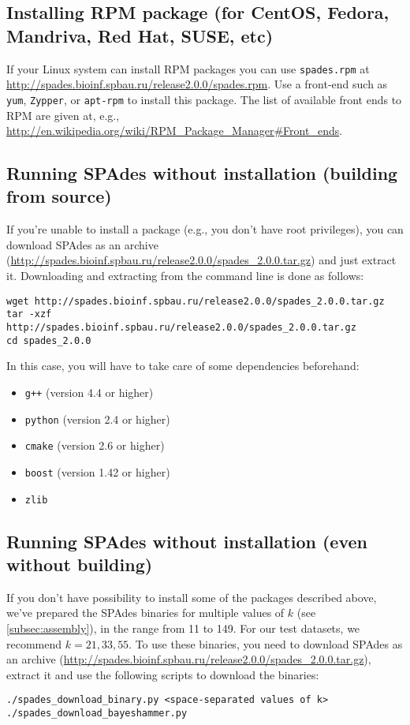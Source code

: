 \documentclass{article}
\def\spades{SPAdes}
\begin{document}
\subsection{Installing RPM package (for CentOS, Fedora, Mandriva, Red Hat, SUSE, etc)}\label{subsec:rpm_package}
If your Linux system can install RPM packages you can use {\tt spades.rpm}
at \url{http://spades.bioinf.spbau.ru/release2.0.0/spades.rpm}. Use a front-end
such as {\tt yum}, {\tt Zypper}, or {\tt apt-rpm} to install this package.
The list of available front ends to RPM are given at, e.g.,
\url{http://en.wikipedia.org/wiki/RPM_Package_Manager#Front_ends}.

\subsection{Running {\spades} without installation (building from source)}\label{subsec:archive}
If you're unable to install a package (e.g., you don't have root privileges),
you can download {\spades} as an archive (\url{http://spades.bioinf.spbau.ru/release2.0.0/spades_2.0.0.tar.gz}) and just extract it.
Downloading and extracting from the command line is done as follows:
\begin{lstlisting}
wget http://spades.bioinf.spbau.ru/release2.0.0/spades_2.0.0.tar.gz
tar -xzf http://spades.bioinf.spbau.ru/release2.0.0/spades_2.0.0.tar.gz
cd spades_2.0.0
\end{lstlisting}
In this case, you will have to take care of some dependencies beforehand:
\begin{itemize}
\item {\tt g++} (version 4.4 or higher)
\item {\tt python} (version 2.4 or higher)
\item {\tt cmake} (version 2.6 or higher)
\item {\tt boost} (version 1.42 or higher)
\item {\tt zlib}
\end{itemize}

\subsection{Running {\spades} without installation (even without building)}\label{subsec:binaries}

If you don't have possibility to install some of the packages described above,
we've prepared the {\spades} binaries for multiple values of $k$ (see 
\cref{subsec:assembly}),
in the range from 11 to 149. For our test datasets, we recommend $k = 21, 33, 55$.
To use these binaries, you need to download {\spades} as an archive (\url{http://spades.bioinf.spbau.ru/release2.0.0/spades_2.0.0.tar.gz}),
extract it and use the following scripts to download the binaries:
\begin{lstlisting}
./spades_download_binary.py <space-separated values of k>
./spades_download_bayeshammer.py
\end{lstlisting}
\end{document}
